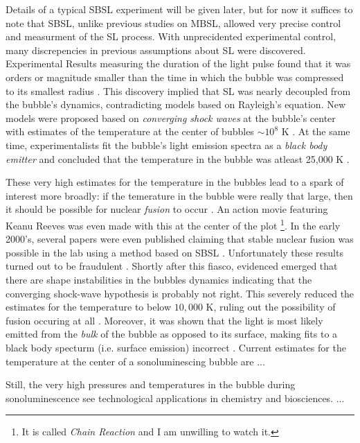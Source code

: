 \documentclass[rmp,aps,nofootinbib,superscriptaddress,floatfix]{revtex4-2}
\begin{document}
Details of a typical SBSL experiment will be given later, but for now it suffices to note that SBSL, unlike previous studies on MBSL, allowed very precise control and measurment of the SL process. With unprecidented experimental control, many discrepencies in previous assumptions about SL were discovered. Experimental Results measuring the duration of the light pulse found that it was orders or magnitude smaller than the time in which the bubble was compressed to its smallest radius \cite{barber1992resolving,barber1991observation}. This discovery implied that SL was nearly decoupled from the bubble's dynamics, contradicting models based on Rayleigh's equation. New models were proposed based on \emph{converging shock waves} at the bubble's center with estimates of the temperature at the center of bubbles $\sim10^8$ K \cite{wu1993shock,greenspan1993sonoluminescence}. At the same time, experimentalists fit the bubble's light emission spectra as a \emph{black body emitter} and concluded that the temperature in the bubble was atleast 25,000 K \cite{hiller1992spectrum}.

These very high estimates for the temperature in the bubbles lead to a spark of interest more broadly: if the temerature in the bubble were really that large, then it should be possible for nuclear \emph{fusion} to occur \cite{}. An action movie featuring Keanu Reeves was even made with this at the center of the plot \footnote{It is called \emph{Chain Reaction} and I am unwilling to watch it.}. In the early 2000's, several papers were even published claiming that stable nuclear fusion was possible in the lab using a method based on SBSL \cite{}. Unfortunately these results turned out to be fraudulent \cite{}. Shortly after this fiasco, evidenced emerged that there are shape instabilities in the bubbles dynamics indicating that the converging shock-wave hypothesis is probably not right. This severely reduced the estimates for the temperature to below $10,000$ K, ruling out the possibility of fusion occuring at all \cite{}. Moreover, it was shown that the light is most likely emitted from the \emph{bulk} of the bubble as opposed to its surface, making fits to a black body specturm (i.e. surface emission) incorrect \cite{}. Current estimates for the temperature at the center of a sonoluminescing bubble are $...$ \cite{}

Still, the very high pressures and temperatures in the bubble during sonoluminescence see technological applications in chemistry and biosciences. ...
\end{document}
